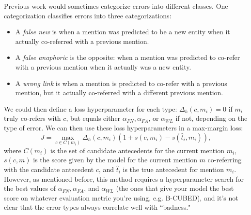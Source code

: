 Previous work would sometimes categorize errors into different classes. One categorization classifies errors into three categorizations:
\begin{itemize}
\item A \emph{false new} is when a mention was predicted to be a new entity when it actually co-referred with a previous mention.
\item A \emph{false anaphoric} is the opposite: when a mention was predicted to co-refer with a previous mention when it actually was a new entity.
\item A \emph{wrong link} is when a mention is predicted to co-refer with a previous mention, but it actually co-referred with a different previous mention.
\end{itemize}
We could then define a loss hyperparameter for each type: $\Delta_h(c, m_i) = 0$ if $m_i$ truly co-refers with $c$, but equals either $\alpha_{FN}, \alpha_{FA}$, or $\alpha_{WL}$ if not, depending on the type of error. We can then use these loss hyperparameters in a max-margin loss:
$$J = \max_{c \in C(m_i)} \Delta_h\left(c, m_i\right) \left(1 + s\left(c, m_i\right) - s\left(\hat{t}_i, m_i\right)\right),$$
where $C(m_i)$ is the set of candidate antecedents for the current mention $m_i$, $s(c, m)$ is the score given by the model for the current mention $m$ co-referring with the candidate antecedent $c$, and $\hat{t}_i$ is the true antecedent for mention $m_i$. However, as mentioned before, this method requires a hyperparameter search for the best values of $\alpha_{FN}, \alpha_{FA}$, and $\alpha_{WL}$ (the ones that give your model the best score on whatever evaluation metric you're using, e.g. B-CUBED), and it's not clear that the error types always correlate well with ``badness."


